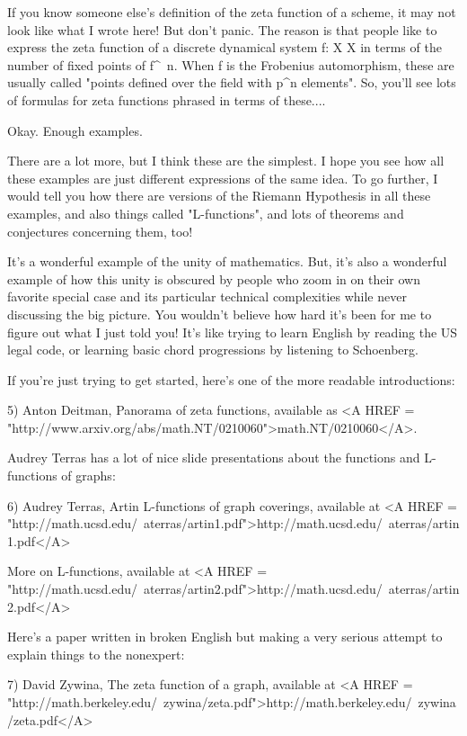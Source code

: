 If you know someone else's definition of the zeta function of a scheme, 
it may not look like what I wrote here!   But don't panic.  The reason is 
that people like to express the zeta function of a discrete dynamical system 
f: X \to  X in terms of the number of fixed points of f^{\ n}.  
When f is the 
Frobenius automorphism, these are usually called "points defined over the 
field with p^{n} elements".  So, you'll see lots of formulas for 
zeta functions phrased in terms of these....

Okay.  Enough examples.

There are a lot more, but I think these are the simplest.  I hope you see 
how all these examples are just different expressions of the same idea.
To go further, I would tell you how there are versions of the Riemann 
Hypothesis in all these examples, and also things called "L-functions", 
and lots of theorems and conjectures concerning them, too!  

It's a wonderful example of the unity of mathematics.  But, it's also
a wonderful example of how this unity is obscured by people who zoom 
in on their own favorite special case and its particular technical 
complexities while never discussing the big picture.  You wouldn't 
believe how hard it's been for me to figure out what I just told you! 
It's like trying to learn English by reading the US legal code, or
learning basic chord progressions by listening to Schoenberg.  

If you're just trying to get started, here's one of the more readable 
introductions:

5) Anton Deitman, Panorama of zeta functions, available as 
<A HREF = "http://www.arxiv.org/abs/math.NT/0210060">math.NT/0210060</A>.

Audrey Terras has a lot of nice slide presentations about the \zeta  functions 
and L-functions of graphs:

6) Audrey Terras, Artin L-functions of graph coverings, 
available at 
<A HREF = "http://math.ucsd.edu/~aterras/artin1.pdf">http://math.ucsd.edu/~aterras/artin1.pdf</A>

More on L-functions, available at 
<A HREF = "http://math.ucsd.edu/~aterras/artin2.pdf">http://math.ucsd.edu/~aterras/artin2.pdf</A>

Here's a paper written in broken English but making a very serious attempt 
to explain things to the nonexpert:

7) David Zywina, The zeta function of a graph, available at
<A HREF = "http://math.berkeley.edu/~zywina/zeta.pdf">http://math.berkeley.edu/~zywina/zeta.pdf</A>


